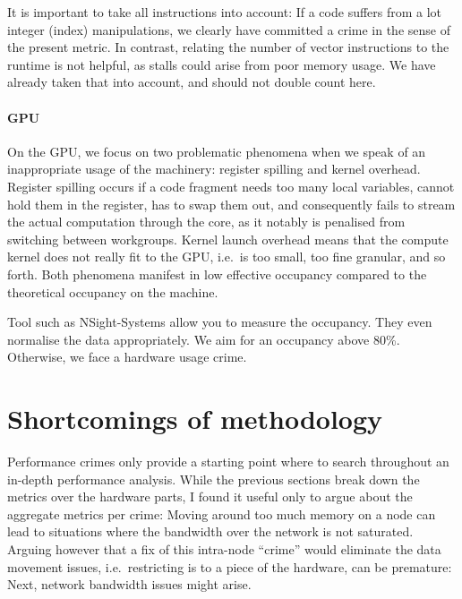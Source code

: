 It is important to take all instructions into account:
If a code suffers from a lot integer (index) manipulations, we clearly have
committed a crime in the sense of the present metric.
In contrast, relating the number of vector instructions to the runtime is not
helpful, as stalls could arise from poor memory usage.
We have already taken that into account, and should not double count here.






\paragraph*{GPU}

On the GPU, we focus on two problematic phenomena when we speak of an
inappropriate usage of the machinery:
register spilling and kernel overhead.
Register spilling occurs if a code fragment needs too many local variables,
cannot hold them in the register, has to swap them out, and consequently fails
to stream the actual computation through the core, as it notably is penalised
from switching between workgroups.
Kernel launch overhead means that the compute kernel does not really fit to the
GPU, i.e.~is too small, too fine granular, and so forth.
Both phenomena manifest in low effective occupancy compared to the theoretical
occupancy on the machine.


Tool such as NSight-Systems allow you to measure the occupancy.
They even normalise the data appropriately.
We aim for an occupancy above 80\%.
Otherwise, we face a hardware usage crime.



\section{Shortcomings of methodology}

Performance crimes only provide a starting point where to search throughout an
in-depth performance analysis. 
While the previous sections break down the metrics over the hardware parts, I
found it useful only to argue about the aggregate metrics per crime:
Moving around too much memory on a node can lead to situations where the
bandwidth over the network is not saturated.
Arguing however that a fix of this intra-node ``crime'' would eliminate the
data movement issues, i.e.~restricting is to a piece of the hardware,
can be premature:
Next, network bandwidth issues might arise.


